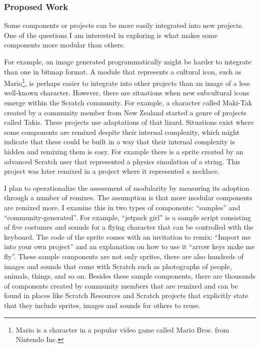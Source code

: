 \subsubsection{Proposed Work}
Some components or projects can be more easily integrated into new projects. 
One of the questions I am interested in exploring is what makes some components more modular than others.

For example, an image generated programmatically might be harder to integrate than one in bitmap format. 
A module that represents a cultural icon, such as Mario\footnote{Mario is a character in a popular video game called Mario Bros. from Nintendo Inc.}, is perhaps easier to integrate into other projects than an image of a less well-known character.
However, there are situations when new subcultural icons emerge within the Scratch community.
For example, a character called Maki-Tak created by a community member from New Zealand started a genre of projects called Takis.
These projects use adaptations of that lizard. 
Situations exist where some components are remixed despite their internal complexity, which might indicate that these could be built in a way that their internal complexity is hidden and remixing them is easy. 
For example there is a sprite created by an advanced Scratch user that represented a physics simulation of a string. 
This project was later remixed in a project where it represented a necklace.

I plan to operationalize the assessment of modularity by measuring its adoption through a number of remixes.
The assumption is that more modular components are remixed more.
I examine this in two types of components: ``samples'' and ``community-generated''.
For example, ``jetpack girl'' is a sample script consisting of five costumes and  sounds for a flying character that can be controlled with the keyboard.
The code of the sprite comes with an invitation to remix: ``Import me into your own project'' and an explanation on how to use it ``arrow keys make me fly''.
These sample components are not only sprites, there are also hundreds of images and sounds that come with Scratch such as photographs of people, animals, things, and so on.
Besides these sample components, there are thousands of components created by community members that are remixed and can be found in places like Scratch Resources and Scratch projects that explicitly state that they include sprites, images and sounds for others to reuse.

